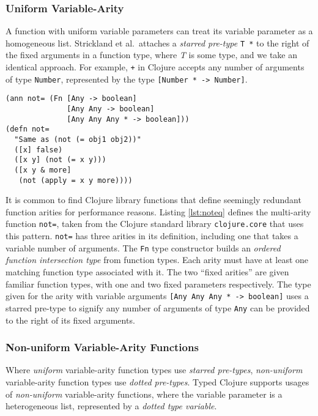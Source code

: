 \subsubsection{Uniform Variable-Arity}

A function with uniform variable parameters can treat its variable parameter
as a homogeneous list. 
Strickland et al.\ attaches a \emph{starred pre-type} \lstinline|T *| to the right of the fixed arguments
in a function type, where \emph{T} is some type, and we take an identical approach.
For example, \lstinline|+| in Clojure accepts any number of arguments
of type \lstinline|Number|, represented by the type \lstinline|[Number * -> Number]|.


\begin{lstlisting}[caption=Typing multi-arity functions, label=lst:noteq]
(ann not= (Fn [Any -> boolean]
              [Any Any -> boolean]
              [Any Any Any * -> boolean]))
(defn not=
  "Same as (not (= obj1 obj2))"
  ([x] false)
  ([x y] (not (= x y)))
  ([x y & more]
   (not (apply = x y more))))
\end{lstlisting}

It is common to find Clojure library functions that define seemingly redundant
function arities for performance reasons.
Listing \ref{lst:noteq} defines the multi-arity function \lstinline|not=|,
taken from the Clojure standard library \lstinline|clojure.core| that uses this pattern.
\lstinline|not=| has three arities in its definition, including
one that takes a variable number of arguments.
The \lstinline|Fn| type constructor builds an \emph{ordered function intersection type} from
function types. Each arity must have at least one matching function type associated with it.
The two ``fixed arities'' are given familiar function types, with one and two fixed parameters respectively.
The type given for the arity with variable arguments \lstinline|[Any Any Any * -> boolean]|
uses a starred pre-type to signify any number of arguments of type \lstinline|Any|
can be provided to the right of its fixed arguments.

\subsubsection{Non-uniform Variable-Arity Functions}

Where \emph{uniform} variable-arity function types use \emph{starred pre-types}, \emph{non-uniform}
variable-arity function types use \emph{dotted pre-types}.
Typed Clojure supports usages of \emph{non-uniform} variable-arity functions,
where the variable parameter is a heterogeneous list, represented by a \emph{dotted type variable}.

